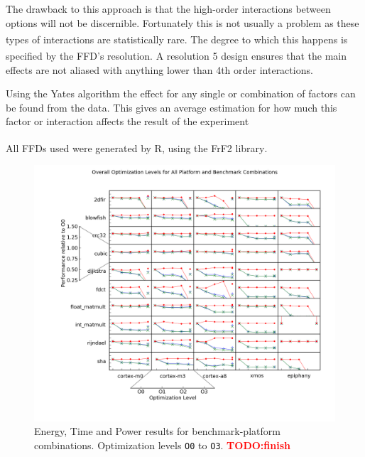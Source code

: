 \documentclass[twocolumn]{article}
\newcommand{\todo}[1]{\textbf{\textcolor{red}{#1}}}
\let\oldcite\cite
\renewcommand{\cite}[1]{\textsuperscript{\oldcite{#1}}}
\begin{document}
The drawback to this approach is that the high-order interactions between options will not be discernible. Fortunately this is not usually a problem as these types of interactions are statistically rare\todo{\cite{REF sparsity of effects?}}. The degree to which this happens is specified by the FFD's resolution\cite{BoxHunter}. A resolution 5 design ensures that the main effects are not aliased with anything lower than 4th order interactions.

Using the Yates algorithm the effect for any single or combination of factors can be found from the data. This gives an average estimation for how much this factor or interaction affects the result of the experiment




All FFDs used were generated by R, using the FrF2 library\cite{FrF2}.


\begin{figure}[tb!]
	\centering
	\includegraphics[width=\textwidth,clip, trim=2cm 1.5cm 0 0]{levels.png}
	\caption{Energy, Time and Power results for benchmark-platform combinations. Optimization levels \texttt{O0} to \texttt{O3}. \todo{TODO:finish}}
	\label{Fig:OverallView}
\end{figure}
\end{document}
